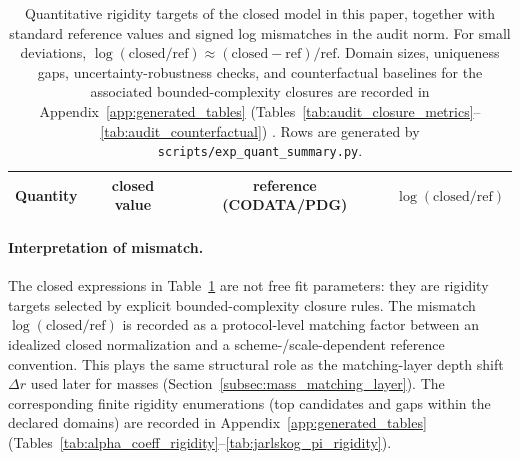 \begin{table}[t]
\centering
\small
\setlength{\tabcolsep}{6pt}
\renewcommand{\arraystretch}{1.15}
\begin{tabular}{lccc}
\toprule
Quantity & closed value & reference (CODATA/PDG) & $\log(\mathrm{closed}/\mathrm{ref})$ \\
\midrule
%
\end{tabular}
\caption{Quantitative rigidity targets of the closed model in this paper, together with standard reference values and signed log mismatches in the audit norm. For small deviations, $\log(\mathrm{closed}/\mathrm{ref})\approx (\mathrm{closed}-\mathrm{ref})/\mathrm{ref}$. Domain sizes, uniqueness gaps, uncertainty-robustness checks, and counterfactual baselines for the associated bounded-complexity closures are recorded in Appendix~\ref{app:generated_tables} (Tables~\ref{tab:audit_closure_metrics}--\ref{tab:audit_counterfactual}) \cite{PDGRPP2024,CODATA2022RMP}. Rows are generated by \texttt{scripts/exp\_quant\_summary.py}.}
\label{tab:quant_summary}
\end{table}

\paragraph{Interpretation of mismatch.}
The closed expressions in Table~\ref{tab:quant_summary} are not free fit parameters: they are rigidity targets selected by explicit bounded-complexity closure rules.
The mismatch $\log(\mathrm{closed}/\mathrm{ref})$ is recorded as a protocol-level matching factor between an idealized closed normalization and a scheme-/scale-dependent reference convention.
This plays the same structural role as the matching-layer depth shift $\Delta r$ used later for masses (Section~\ref{subsec:mass_matching_layer}).
The corresponding finite rigidity enumerations (top candidates and gaps within the declared domains) are recorded in Appendix~\ref{app:generated_tables} (Tables~\ref{tab:alpha_coeff_rigidity}--\ref{tab:jarlskog_pi_rigidity}).

\begin{table}[t]
\centering
\scriptsize
\setlength{\tabcolsep}{6pt}
\renewcommand{\arraystretch}{1.15}
%
\caption{Sigma-normalized mismatch summary for selected key targets. Here $\sigma$ denotes the explicit uncertainty scales used by the audit scripts (either quoted uncertainties or deterministic stress-test scales; see \texttt{scripts/common\_constants.py}). This table is provided for interpretive convenience and does not replace the matching-layer interpretation when reference conventions are scheme/scale dependent or when the quoted mismatch is much larger than the reference uncertainty. Rows are generated by \texttt{scripts/exp\_sigma\_summary.py}.}
\label{tab:sigma_summary}
\end{table}


